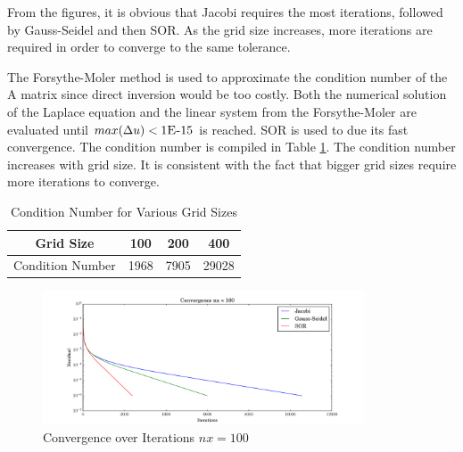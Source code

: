 \documentclass[letterpaper,12pt,]{article}
\begin{document}
From the figures, it is obvious that Jacobi requires the most iterations, followed by Gauss-Seidel and then SOR. As the grid size increases, more iterations are required in order to converge to the same tolerance.

The Forsythe-Moler method is used to approximate the condition number of the A matrix since direct inversion would be too costly.
Both the numerical solution of the Laplace equation and the linear system from the Forsythe-Moler are evaluated until $max(\Delta u) < 1\textsc{E-}15$ is reached.
SOR is used to due its fast convergence.
The condition number is compiled in Table \ref{tab1}.
The condition number increases with grid size. It is consistent with the fact that bigger grid sizes require more iterations to converge.
\begin{table}[h]
\centering
\begin{tabular}{cccc} \toprule
    {Grid Size} & {100} & {200} & {400}\\ \midrule
    {Condition Number} & 1968 & 7905  & 29028\\
\bottomrule
\end{tabular}
\caption{Condition Number for Various Grid Sizes}
\label{tab1}
\end{table}


\begin{figure}[!h]
    \centering
    \includegraphics[width = 0.85\textwidth]{./Figures/Conv100.pdf}
    \caption{Convergence over Iterations $nx = 100$}
    \label{fig:conv100}
\end{figure}
\end{document}

